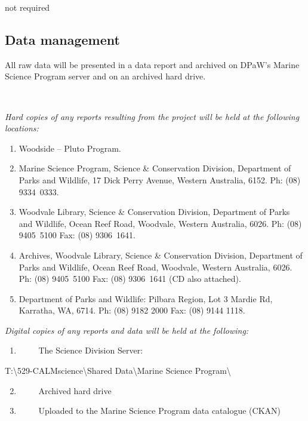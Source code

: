 \documentclass[version=last,
    paper=a4,                               %
    10pt,                                   %
    dvipsnames,
    oneside,                              %
    headings=openany,                       %
    open=any,
    BCOR=7mm,                               %
    DIV=15,     %
]{scrbook}
\providecommand{\tightlist}{\setlength{\itemsep}{0pt}\setlength{\parskip}{0pt}}
\begin{document}
not required




\subsection*{Data management}

All raw data will be presented in a data report and archived on DPaW's
Marine Science Program server and on an archived hard drive.

~

\emph{Hard copies of any reports resulting from the project will be held
at the following locations:}

\begin{enumerate}
\tightlist
\item
  Woodside -- Pluto Program.
\item
  Marine Science Program, Science \& Conservation Division, Department
  of Parks and Wildlife, 17 Dick Perry Avenue, Western Australia, 6152.
  Ph: (08) 9334~0333.
\item
  Woodvale Library, Science \& Conservation Division, Department of
  Parks and Wildlife, Ocean Reef Road, Woodvale, Western Australia,
  6026. Ph: (08) 9405~5100 Fax: (08) 9306~1641.~
\item
  Archives, Woodvale Library, Science \& Conservation Division,
  Department of Parks and Wildlife, Ocean Reef Road, Woodvale, Western
  Australia, 6026. Ph: (08) 9405~5100 Fax: (08) 9306~1641 (CD also
  attached).
\item
  Department of Parks and Wildlife: Pilbara Region, Lot 3 Mardie Rd,
  Karratha, WA, 6714. Ph: (08) 9182 2000 Fax: (08) 9144 1118.
\end{enumerate}

\emph{Digital copies of any reports and data will be held at the
following:}

\begin{enumerate}
\tightlist
\item
  ~~~~ The Science Division Server:
\end{enumerate}

T:\textbackslash529-CALMscience\textbackslash Shared
Data\textbackslash Marine Science Program\textbackslash{}

\begin{enumerate}
\setcounter{enumi}{1}
\tightlist
\item
  ~~~~ Archived hard drive
\item
  ~~~~ Uploaded to the Marine Science Program data catalogue (CKAN)
\end{enumerate}
\end{document}
